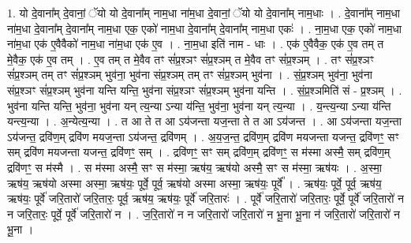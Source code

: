 \documentclass[17pt]{extarticle}
\begin{document}
1. यो दे॒वाना᳚म् दे॒वानां॒ ॅयो यो दे॒वाना᳚म् नाम॒धा ना॑म॒धा दे॒वानां॒ ॅयो यो दे॒वाना᳚म् नाम॒धाः । . दे॒वाना᳚म् नाम॒धा ना॑म॒धा दे॒वाना᳚म् दे॒वाना᳚म् नाम॒धा एक॒ एको॑ नाम॒धा दे॒वाना᳚म् दे॒वाना᳚म् नाम॒धा एकः॑ । . ना॒म॒धा एक॒ एको॑ नाम॒धा ना॑म॒धा एक॑ ए॒वैवैको॑ नाम॒धा ना॑म॒धा एक॑ ए॒व । . ना॒म॒धा इति॑ नाम - धाः । . एक॑ ए॒वैवैक॒ एक॑ ए॒व तम् त मे॒वैक॒ एक॑ ए॒व तम् । . ए॒व तम् त मे॒वैव तꣳ सं॑प्र॒श्ञꣳ सं॑प्र॒श्ञम् त मे॒वैव तꣳ सं॑प्र॒श्ञम् । . तꣳ सं॑प्र॒श्ञꣳ सं॑प्र॒श्ञम् तम् तꣳ सं॑प्र॒श्ञम् भुव॑ना॒ भुव॑ना संप्र॒श्ञम् तम् तꣳ सं॑प्र॒श्ञम् भुव॑ना । . सं॒प्र॒श्ञम् भुव॑ना॒ भुव॑ना संप्र॒श्ञꣳ सं॑प्र॒श्ञम् भुव॑ना यन्ति यन्ति॒ भुव॑ना संप्र॒श्ञꣳ सं॑प्र॒श्ञम् भुव॑ना यन्ति । . सं॒प्र॒श्ञमिति॑ सं - प्र॒श्ञम् । . भुव॑ना यन्ति यन्ति॒ भुव॑ना॒ भुव॑ना यन् त्य॒न्या ऽन्या य॑न्ति॒ भुव॑ना॒ भुव॑ना यन् त्य॒न्या । . य॒न्त्य॒न्या ऽन्या य॑न्ति यन्त्य॒न्या । . अ॒न्येत्य॒न्या । . त आ ते त आ ऽय॑जन्ता यज॒न्ता ते त आ ऽय॑जन्त । . आ ऽय॑जन्ता यज॒न्ता ऽय॑जन्त॒ द्रवि॑ण॒म् द्रवि॑ण मयज॒न्ता ऽय॑जन्त॒ द्रवि॑णम् । . अ॒य॒ज॒न्त॒ द्रवि॑ण॒म् द्रवि॑ण मयजन्ता यजन्त॒ द्रवि॑णꣳ॒॒ सꣳ सम् द्रवि॑ण मयजन्ता यजन्त॒ द्रवि॑णꣳ॒॒ सम् । . द्रवि॑णꣳ॒॒ सꣳ सम् द्रवि॑ण॒म् द्रवि॑णꣳ॒॒ स म॑स्मा अस्मै॒ सम् द्रवि॑ण॒म् द्रवि॑णꣳ॒॒ स म॑स्मै । . स म॑स्मा अस्मै॒ सꣳ स म॑स्मा॒ ऋष॑य॒ ऋष॑यो अस्मै॒ सꣳ स म॑स्मा॒ ऋष॑यः । . अ॒स्मा॒ ऋष॑य॒ ऋष॑यो अस्मा अस्मा॒ ऋष॑यः॒ पूर्वे॒ पूर्व॒ ऋष॑यो अस्मा अस्मा॒ ऋष॑यः॒ पूर्वे᳚ । . ऋष॑यः॒ पूर्वे॒ पूर्व॒ ऋष॑य॒ ऋष॑यः॒ पूर्वे॑ जरि॒तारो॑ जरि॒तारः॒ पूर्व॒ ऋष॑य॒ ऋष॑यः॒ पूर्वे॑ जरि॒तारः॑ । . पूर्वे॑ जरि॒तारो॑ जरि॒तारः॒ पूर्वे॒ पूर्वे॑ जरि॒तारो॑ न न जरि॒तारः॒ पूर्वे॒ पूर्वे॑ जरि॒तारो॑ न । . ज॒रि॒तारो॑ न न जरि॒तारो॑ जरि॒तारो॑ न भू॒ना भू॒ना न॑ जरि॒तारो॑ जरि॒तारो॑ न भू॒ना । \newline
\end{document}

